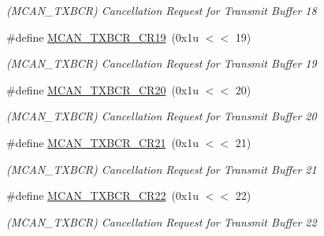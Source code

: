 \begin{DoxyCompactItemize}
\begin{DoxyCompactList}\small\item\em (M\+C\+A\+N\+\_\+\+T\+X\+B\+CR) Cancellation Request for Transmit Buffer 18 \end{DoxyCompactList}\item 
\mbox{\label{group__SAME70__MCAN_gaa9b6541f9c09ef574d52fcc5347d53d3}} 
\#define \mbox{\hyperlink{group__SAME70__MCAN_gaa9b6541f9c09ef574d52fcc5347d53d3}{M\+C\+A\+N\+\_\+\+T\+X\+B\+C\+R\+\_\+\+C\+R19}}~(0x1u $<$$<$ 19)
\begin{DoxyCompactList}\small\item\em (M\+C\+A\+N\+\_\+\+T\+X\+B\+CR) Cancellation Request for Transmit Buffer 19 \end{DoxyCompactList}\item 
\mbox{\label{group__SAME70__MCAN_gaf7d1742b93cf103c20d51e4c65475c18}} 
\#define \mbox{\hyperlink{group__SAME70__MCAN_gaf7d1742b93cf103c20d51e4c65475c18}{M\+C\+A\+N\+\_\+\+T\+X\+B\+C\+R\+\_\+\+C\+R20}}~(0x1u $<$$<$ 20)
\begin{DoxyCompactList}\small\item\em (M\+C\+A\+N\+\_\+\+T\+X\+B\+CR) Cancellation Request for Transmit Buffer 20 \end{DoxyCompactList}\item 
\mbox{\label{group__SAME70__MCAN_ga72056e12d5f9d0473d80b173dd96c5c0}} 
\#define \mbox{\hyperlink{group__SAME70__MCAN_ga72056e12d5f9d0473d80b173dd96c5c0}{M\+C\+A\+N\+\_\+\+T\+X\+B\+C\+R\+\_\+\+C\+R21}}~(0x1u $<$$<$ 21)
\begin{DoxyCompactList}\small\item\em (M\+C\+A\+N\+\_\+\+T\+X\+B\+CR) Cancellation Request for Transmit Buffer 21 \end{DoxyCompactList}\item 
\mbox{\label{group__SAME70__MCAN_ga024dd1dc4fec402f9814046c439abc1f}} 
\#define \mbox{\hyperlink{group__SAME70__MCAN_ga024dd1dc4fec402f9814046c439abc1f}{M\+C\+A\+N\+\_\+\+T\+X\+B\+C\+R\+\_\+\+C\+R22}}~(0x1u $<$$<$ 22)
\begin{DoxyCompactList}\small\item\em (M\+C\+A\+N\+\_\+\+T\+X\+B\+CR) Cancellation Request for Transmit Buffer 22 \end{DoxyCompactList}\item 

\end{DoxyCompactItemize}
